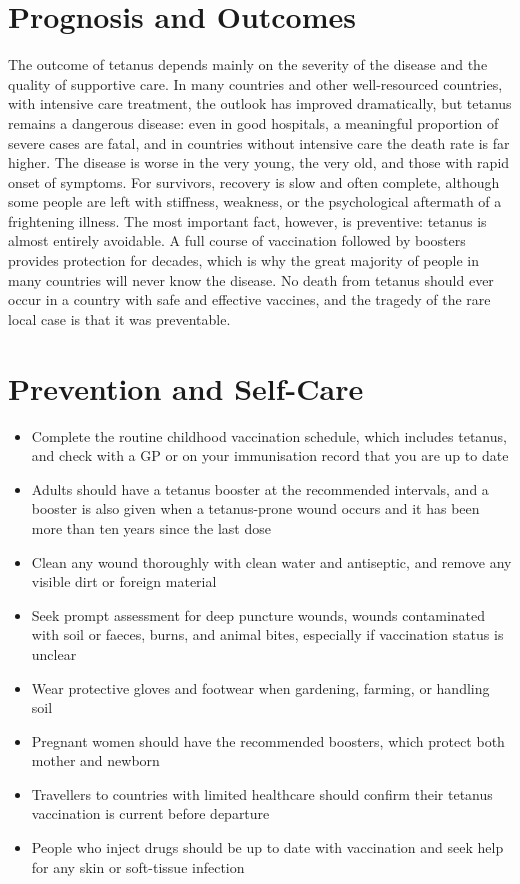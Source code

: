 \section*{Prognosis and Outcomes}
The outcome of tetanus depends mainly on the severity of the disease and the quality of supportive care. In many countries and other well-resourced countries, with intensive care treatment, the outlook has improved dramatically, but tetanus remains a dangerous disease: even in good hospitals, a meaningful proportion of severe cases are fatal, and in countries without intensive care the death rate is far higher. The disease is worse in the very young, the very old, and those with rapid onset of symptoms. For survivors, recovery is slow and often complete, although some people are left with stiffness, weakness, or the psychological aftermath of a frightening illness. The most important fact, however, is preventive: tetanus is almost entirely avoidable. A full course of vaccination followed by boosters provides protection for decades, which is why the great majority of people in many countries will never know the disease. No death from tetanus should ever occur in a country with safe and effective vaccines, and the tragedy of the rare local case is that it was preventable.

\section*{Prevention and Self-Care}
\begin{itemize}
    \item Complete the routine childhood vaccination schedule, which includes tetanus, and check with a GP or on your immunisation record that you are up to date
    \item Adults should have a tetanus booster at the recommended intervals, and a booster is also given when a tetanus-prone wound occurs and it has been more than ten years since the last dose
    \item Clean any wound thoroughly with clean water and antiseptic, and remove any visible dirt or foreign material
    \item Seek prompt assessment for deep puncture wounds, wounds contaminated with soil or faeces, burns, and animal bites, especially if vaccination status is unclear
    \item Wear protective gloves and footwear when gardening, farming, or handling soil
    \item Pregnant women should have the recommended boosters, which protect both mother and newborn
    \item Travellers to countries with limited healthcare should confirm their tetanus vaccination is current before departure
    \item People who inject drugs should be up to date with vaccination and seek help for any skin or soft-tissue infection
\end{itemize}

